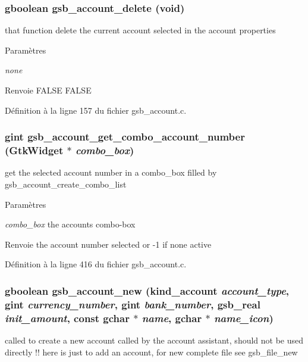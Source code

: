 \subsubsection[{gsb\_\-account\_\-delete}]{\setlength{\rightskip}{0pt plus 5cm}gboolean gsb\_\-account\_\-delete (void)}\label{gsb__account_8h_a7400463771b2b5905b261cb177c2524e}
that function delete the current account selected in the account properties 
\begin{DoxyParams}{Paramètres}
\item[{\em none}]\end{DoxyParams}
\begin{DoxyReturn}{Renvoie}
FALSE FALSE 
\end{DoxyReturn}


Définition à la ligne 157 du fichier gsb\_\-account.c.

\subsubsection[{gsb\_\-account\_\-get\_\-combo\_\-account\_\-number}]{\setlength{\rightskip}{0pt plus 5cm}gint gsb\_\-account\_\-get\_\-combo\_\-account\_\-number (GtkWidget $\ast$ {\em combo\_\-box})}\label{gsb__account_8h_a8c27c31186134dfd2a9ee5a1ca0b4d2d}
get the selected account number in a combo\_\-box filled by gsb\_\-account\_\-create\_\-combo\_\-list


\begin{DoxyParams}{Paramètres}
\item[{\em combo\_\-box}]the accounts combo-\/box\end{DoxyParams}
\begin{DoxyReturn}{Renvoie}
the account number selected or -\/1 if none active 
\end{DoxyReturn}


Définition à la ligne 416 du fichier gsb\_\-account.c.

\subsubsection[{gsb\_\-account\_\-new}]{\setlength{\rightskip}{0pt plus 5cm}gboolean gsb\_\-account\_\-new ({\bf kind\_\-account} {\em account\_\-type}, \/  gint {\em currency\_\-number}, \/  gint {\em bank\_\-number}, \/  {\bf gsb\_\-real} {\em init\_\-amount}, \/  const gchar $\ast$ {\em name}, \/  gchar $\ast$ {\em name\_\-icon})}\label{gsb__account_8h_a7cddd8b32f2176fe159c0dfa59dc074c}
called to create a new account called by the account assistant, should not be used directly !! here is just to add an account, for new complete file see gsb\_\-file\_\-new


